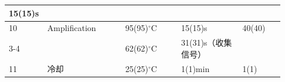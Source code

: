 \documentclass[UTF8,10pt,a4paper,fontset=fandol]{ctexart}
\newcommand{\fieldvalue}[1]{#1}
\newcommand{\handwritten}[1]{#1}
\begin{document}
\begin{tabular}{|p{0.08\linewidth}|p{0.28\linewidth}|p{0.20\linewidth}|p{0.22\linewidth}|p{0.15\linewidth}|}
\fieldvalue{\handwritten{15}}(15)s &
\\
\hline
10 & Amplification &
\fieldvalue{\handwritten{95}}(95)$^\circ$C &
\fieldvalue{\handwritten{15}}(15)s &
\fieldvalue{\handwritten{40}}(40) \\
\cline{3-4}
 & &
\fieldvalue{\handwritten{62}}(62)$^\circ$C &
\fieldvalue{\handwritten{31}}(31)s（收集信号） &
\\
\hline
11 & 冷却 &
\fieldvalue{\handwritten{25}}(25)$^\circ$C &
\fieldvalue{\handwritten{1}}(1)min &
\fieldvalue{\handwritten{1}}(1) \\
\hline
\end{tabular}

\vspace{2mm}
\end{document}
